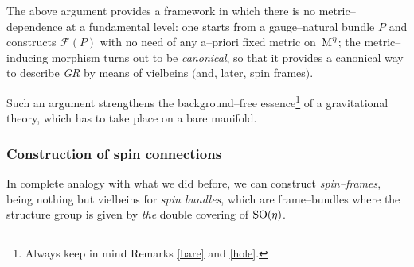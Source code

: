     

\begin{remark}\label{backgroundfree}%
    The above argument provides a framework in which there is no metric--dependence at a fundamental level: one starts from a gauge--natural bundle $P$ and constructs $\mathcal{F}(P)$ with no need of any a--priori fixed metric on \,$\text{\normalfont M}^\eta$; the metric--inducing morphism turns out to be \emph{canonical}, so that it provides a canonical way to describe \emph{GR} by means of vielbeins $($and, later, spin frames$)$. 
    
    Such an argument strengthens the background--free essence\footnote{Always keep in mind Remarks \ref{bare} and \ref{hole}.} of a gravitational theory, which has to take place on a bare manifold.
\end{remark}

\subsubsection{Construction of spin connections}
    In complete analogy with what we did before, we can construct \emph{spin--frames}, being nothing but vielbeins for \emph{spin bundles}, which are frame--bundles where the structure group is given by \emph{the} double covering of $\text{\normalfont SO}(\eta)$. 
    
